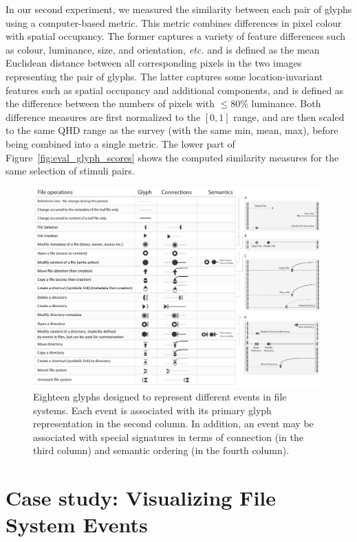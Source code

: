 In our second experiment, we measured the similarity between each pair of glyphs using a computer-based metric.
This metric combines differences in pixel colour with spatial occupancy.
The former captures a variety of feature differences such as colour, luminance, size, and orientation, \emph{etc.} and is defined as the mean Euclidean distance between all corresponding pixels in the two images representing the pair of glyphs.
The latter captures some location-invariant features such as spatial occupancy and additional components, and is defined as the difference between the numbers of pixels with $\leq 80\%$ luminance.
Both difference measures are first normalized to the $[0, 1]$ range, and are then scaled to the same QHD range as the survey (with the same min, mean, max), before being combined into a single metric.
The lower part of Figure~\ref{fig:eval_glyph_scores} shows the computed similarity measures for the same selection of stimuli pairs.

\begin{figure}[t]
\begin{center}
\includegraphics[width=0.99\textwidth]{images/filesystem/table_new}
\end{center}
\caption{Eighteen glyphs designed to represent different events in file systems.
Each event is associated with its primary glyph representation in the second column.
In addition, an event may be associated with special signatures in terms of connection (in the third column) and semantic ordering (in the fourth column).}
\label{table:fileoperations}
\end{figure}

\section{Case study: Visualizing File System Events}
\label{sec:casestudy}

